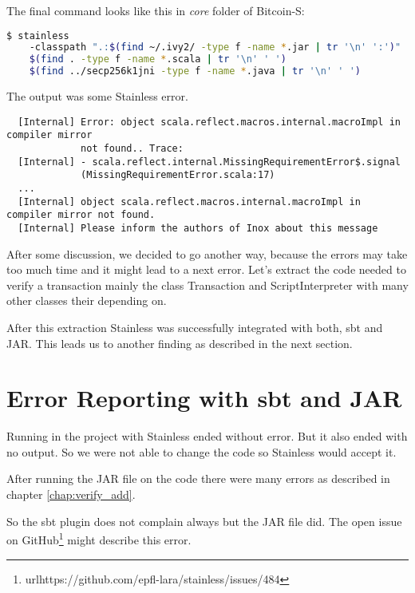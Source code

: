 The final command looks like this in \emph{core} folder of Bitcoin-S:
\begin{lstlisting}[language=bash]
  $ stainless
    -classpath ".:$(find ~/.ivy2/ -type f -name *.jar | tr '\n' ':')"
    $(find . -type f -name *.scala | tr '\n' ' ')
    $(find ../secp256k1jni -type f -name *.java | tr '\n' ' ')
\end{lstlisting}

The output was some Stainless error.
\begin{verbatim}
  [Internal] Error: object scala.reflect.macros.internal.macroImpl in compiler mirror
             not found.. Trace:
  [Internal] - scala.reflect.internal.MissingRequirementError$.signal
             (MissingRequirementError.scala:17)
  ...
  [Internal] object scala.reflect.macros.internal.macroImpl in compiler mirror not found.
  [Internal] Please inform the authors of Inox about this message
\end{verbatim}

After some discussion, we decided to go another way, because the errors may take too much time and it might lead to a next error.
Let's extract the code needed to verify a transaction mainly the class Transaction and ScriptInterpreter with many other classes their depending on.

After this extraction Stainless was successfully integrated with both, sbt and JAR.
This leads us to another finding as described in the next section.


\section{Error Reporting with sbt and JAR}

Running  in the project with Stainless ended without error.
But it also ended with no output.
So we were not able to change the code so Stainless would accept it.

After running the JAR file on the code there were many errors as described in chapter \ref{chap:verify_add}.

So the sbt plugin does not complain always but the JAR file did.
The open issue  on GitHub\footnote{url{https://github.com/epfl-lara/stainless/issues/484}} might describe this error.
